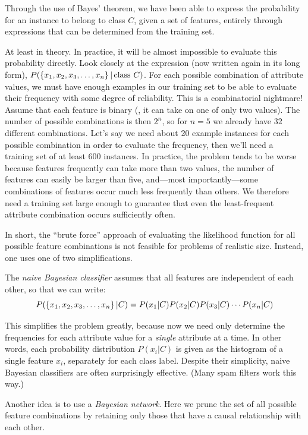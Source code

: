 Through the use of Bayes' theorem, we have been able to express the
probability for an instance to belong to class $C$, given a set of
features, entirely through expressions that can be determined from the
training set.

At least in theory. In practice, it will be almost impossible to
evaluate this probability directly. Look closely at the expression
(now written again in its long form), $P( \left\{ x_1, x_2, x_3,
  \dots, x_n \right\}  | \, \hbox{class $C$} )$. For each possible combination
of attribute values, we must have enough examples in our training set
to be able to evaluate their frequency with some degree of
reliability. This is a combinatorial nightmare! Assume that each
feature is binary (\ie, it can take on one of only two values). The
number of possible combinations is then $2^n$, so for $n=5$ we already
have $32$ different combinations. Let's say we need about 20 example
instances for each possible combination in order to evaluate the
frequency, then we'll need a training set of at least 600 instances.
In practice, the problem tends to be worse because features frequently
can take more than two values, the number of features can easily be
larger than five, and---most importantly---some combinations of
features occur much less frequently than others. We therefore need a
training set large enough to guarantee that even the least-frequent
attribute combination occurs sufficiently often.

In short, the ``brute force'' approach of evaluating the likelihood
function for all possible feature combinations is not feasible for
problems of realistic size. Instead, one uses one of two simplifications.

The \emph{naive Bayesian classifier}  assumes that all features are
independent of each other, so that we can write:
%
\[
P( \left\{ x_1, x_2, x_3, \dots, x_n \right\}  | C )
=
P( x_1 | C ) P( x_2 | C ) P( x_3 | C ) \dotsb P( x_n | C ) 
\]

This simplifies the problem greatly, because now we need only
determine the frequencies for each attribute value for a \emph{single}
attribute at a time. In other words, each probability distribution
$P(x_i|C)$ is given as the histogram of a single feature $x_i$,
separately for each class label.  Despite their simplicity, naive
Bayesian classifiers are often surprisingly effective. (Many spam
filters work this way.)

Another idea is to use a \emph{Bayesian network}.  Here we prune the
set of all possible feature combinations by retaining only those that
have a causal relationship with each other.


